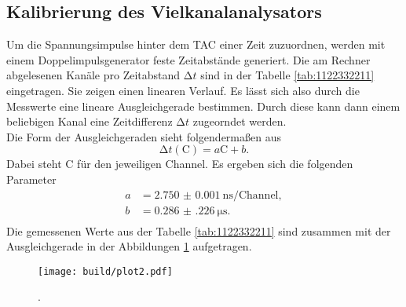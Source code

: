 \subsection{Kalibrierung des Vielkanalanalysators}
Um die Spannungsimpulse hinter dem TAC einer Zeit zuzuordnen, werden mit einem Doppelimpulsgenerator feste Zeitabstände generiert. Die am Rechner abgelesenen Kanäle pro Zeitabstand $\increment t$
sind in der Tabelle \ref{tab:1122332211} eingetragen. Sie zeigen einen linearen Verlauf. Es lässt sich also durch die Messwerte eine lineare Ausgleichgerade bestimmen. Durch diese kann dann einem
beliebigen Kanal eine Zeitdifferenz $\increment t$ zugeorndet werden.
\\
Die Form der Ausgleichgeraden sieht folgendermaßen aus
\begin{equation}
\increment t (\text{C}) = a  \text{C} + b.
\end{equation}
Dabei steht $\text{C}$ für den jeweiligen Channel. 
Es ergeben sich die folgenden Parameter
\begin{align*}
    a &= \SI{2.750(1)}{\nano\second\per{\text{Channel}}},\\
    b &= \SI{0.286(226)}{\micro\second}.\\
\end{align*}
Die gemessenen Werte aus der Tabelle \ref{tab:1122332211} sind zusammen mit der Ausgleichgerade in der Abbildungen \ref{fig:333} aufgetragen.
\begin{figure}
    \centering
    \texttt{[image: build/plot2.pdf]}
    \caption{.} 
    \label{fig:333}
\end{figure}